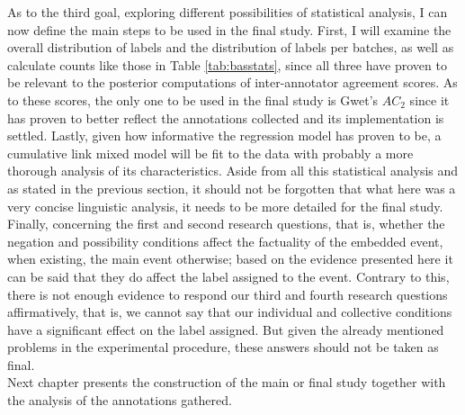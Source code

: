 As to the third goal, exploring different possibilities of statistical analysis, I can now define the main steps to be used in the final study. First, I will examine the overall distribution of labels and the distribution of labels per batches, as well as calculate counts like those in Table \ref{tab:basstats}, since all three have proven to be relevant to the posterior computations of inter-annotator agreement scores. As to these scores, the only one to be used in the final study is Gwet's $AC_2$ since it has proven to better reflect the annotations collected and its implementation is settled. Lastly, given how informative the regression model has proven to be, a cumulative link mixed model will be fit to the data with probably a more thorough analysis of its characteristics. Aside from all this statistical analysis and as stated in the previous section, it should not be forgotten that what here was a very concise linguistic analysis, it needs to be more detailed for the final study.\\  

Finally, concerning the first and second research questions, that is, whether the negation and possibility conditions affect the factuality of the embedded event, when existing, the main event otherwise; based on the evidence presented here it can be said that they do affect the label assigned to the event. Contrary to this, there is not enough evidence to respond our third and fourth research questions affirmatively, that is, we cannot say that our individual and collective conditions have a significant effect on the label assigned. But given the already mentioned problems in the experimental procedure, these answers should not be taken as final.\\

Next chapter presents the construction of the main or final study together with the analysis of the annotations gathered.